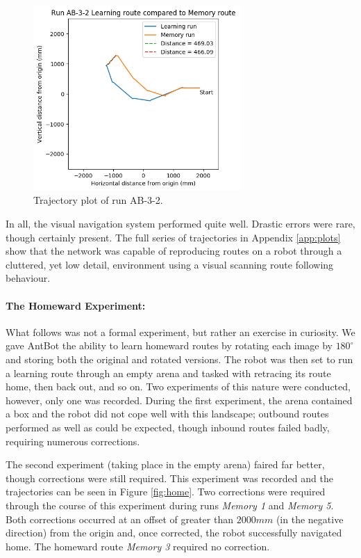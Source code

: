 \documentclass[a4paper,11pt,twoside,openright]{article}
\begin{document}
\begin{figure}
 \centering
  \includegraphics[width=0.7\textwidth]{AB-3-2}
  \caption{
    \label{fig:ab-3-2-inside} Trajectory plot of run AB-3-2.
  }
\end{figure}

\FloatBarrier

In all, the visual navigation system performed quite well. Drastic errors were rare, though certainly present. The full series
of trajectories in Appendix \ref{app:plots} show that the network was capable of reproducing routes on a robot through a
cluttered, yet low detail, environment using a visual scanning route following behaviour.
\newline

\paragraph{The Homeward Experiment:}
What follows was not a formal experiment, but rather an exercise in curiosity. We gave AntBot the ability to learn homeward
routes by rotating each image by $180^{\circ}$ and storing both the original and rotated versions. The robot was then set
to run a learning route through an empty arena and tasked with retracing its route home, then back out, and so on. Two experiments
of this nature were conducted, however, only one was recorded. During the first experiment, the arena contained a box and the
robot did not cope well with this landscape; outbound routes performed as well as could be expected, though inbound routes
failed badly, requiring numerous corrections.
\newline

The second experiment (taking place in the empty arena) faired far better, though
corrections were still required. This experiment was recorded and the trajectories can be seen in Figure \ref{fig:home}. Two corrections were required
through the course of this experiment during runs \textit{Memory 1} and \textit{Memory 5}. Both corrections occurred
at an offset of greater than $2000mm$ (in the negative direction) from the origin and, once corrected, the robot successfully
navigated home. The homeward route \textit{Memory 3} required no correction.
\newline
\end{document}
